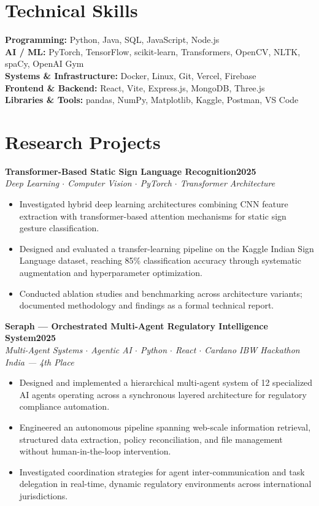 \documentclass[11pt,letterpaper]{article}
\newcommand{\entry}[3]{%
  \noindent\textbf{#1}\hfill\textbf{#2}\\[1pt]
  \textit{\small #3}\par\vspace{1pt}
}
\begin{document}
\section{Technical Skills}
\textbf{Programming:} Python, Java, SQL, JavaScript, Node.js\\
\textbf{AI / ML:} PyTorch, TensorFlow, scikit-learn, Transformers, OpenCV, NLTK,
spaCy, OpenAI Gym\\
\textbf{Systems \& Infrastructure:} Docker, Linux, Git, Vercel, Firebase\\
\textbf{Frontend \& Backend:} React, Vite, Express.js, MongoDB, Three.js\\
\textbf{Libraries \& Tools:} pandas, NumPy, Matplotlib, Kaggle, Postman, VS Code

\section{Research Projects}

\entry{Transformer-Based Static Sign Language Recognition}{2025}
{Deep Learning $\cdot$ Computer Vision $\cdot$ PyTorch $\cdot$ Transformer Architecture}
\begin{itemize}
  \item Investigated hybrid deep learning architectures combining CNN feature
        extraction with transformer-based attention mechanisms for static sign
        gesture classification.
  \item Designed and evaluated a transfer-learning pipeline on the Kaggle Indian
        Sign Language dataset, reaching 85\% classification accuracy through
        systematic augmentation and hyperparameter optimization.
  \item Conducted ablation studies and benchmarking across architecture variants;
        documented methodology and findings as a formal technical report.
\end{itemize}
\vspace{3pt}

\entry{Seraph --- Orchestrated Multi-Agent Regulatory Intelligence System}{2025}
{Multi-Agent Systems $\cdot$ Agentic AI $\cdot$ Python $\cdot$ React $\cdot$ Cardano IBW Hackathon India --- 4th Place}
\begin{itemize}
  \item Designed and implemented a hierarchical multi-agent system of 12
        specialized AI agents operating across a synchronous layered architecture
        for regulatory compliance automation.
  \item Engineered an autonomous pipeline spanning web-scale information retrieval,
        structured data extraction, policy reconciliation, and file management
        without human-in-the-loop intervention.
  \item Investigated coordination strategies for agent inter-communication and
        task delegation in real-time, dynamic regulatory environments across
        international jurisdictions.
\end{itemize}
\vspace{3pt}
\end{document}
